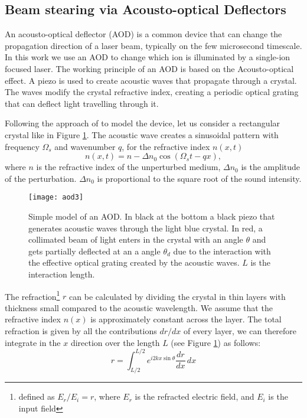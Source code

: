 \subsection{Beam stearing via Acousto-optical Deflectors}
\label{theory_AOD}
An acousto-optical deflector (AOD) is a common device that can change the propagation direction of a laser beam, typically on the few microsecond timescale. In this work we use an AOD to change which ion is illuminated by a single-ion focused laser. The working principle of an AOD is based on the Acousto-optical effect. A piezo is used to create acoustic waves that propagate through a crystal. The waves modify the crystal refractive index, creating a periodic optical grating that can deflect light travelling through it.  \par
Following the approach of \cite{saleh} to model the device, let us consider a rectangular crystal like in Figure \ref{AOD}. The acoustic wave creates a sinusoidal pattern with frequency $\Omega_s$ and wavenumber $q$, for the refractive index $n(x,t)$
\begin{equation}
n(x,t) = n - \Delta n_0 \cos \left(\Omega_s t - qx \right),
\end{equation}
where $n$ is the refractive index of the unperturbed medium, $\Delta n_0$ is the amplitude of the perturbation. $\Delta n_0$ is proportional to the square root of the sound intensity.
\begin{figure}
\centering
\texttt{[image: aod3]}
\caption{Simple model of an AOD. In black at the bottom a black piezo that generates acoustic waves through the light blue crystal. In red, a collimated beam of light enters in the crystal with an angle $\theta$ and gets partially deflected at an a angle $\theta_d$ due to the interaction with the effective optical grating created by the acoustic waves. $L$ is the interaction length.}
\label{AOD}
\end{figure}
The refraction\footnote{defined as $E_r/E_i = r$, where $E_r$ is the refracted electric field, and $E_i$ is the input field} $r$ can be calculated by dividing the crystal in thin layers with thickness small compared to the acoustic wavelength. We assume that the refractive index $n(x)$ is approximately constant across the layer. The total refraction is given by all the contributions $dr/dx$ of every layer, we can therefore integrate in the $x$ direction over the length $L$ (see Figure \ref{AOD}) as follows:
\begin{equation}
r = \int_{L/2}^{L/2} e^{i2kx \sin\theta} \frac{dr}{dx} \,dx
\end{equation}
